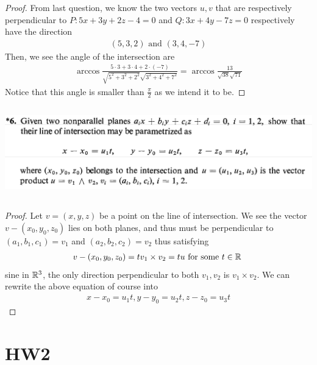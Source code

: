\documentclass{report}
\begin{document}
\begin{proof}
From last question, we know the two vectors $u,v$ that are respectively perpendicular to  $P:5x+3y+2z-4=0$ and  $Q:3x+4y-7z=0$ respectively have the direction 
 \begin{align*}
   (5,3,2)\text{ and }(3,4,-7)
\end{align*}
Then, we see the angle of the intersection are 
\begin{align*}
\arccos \frac{5\cdot 3+3\cdot 4 +2 \cdot (-7)}{\sqrt{5^2+3^2+2^2} \sqrt{3^2+4^2+7^2} }=\arccos \frac{13}{\sqrt{38}\sqrt{71}  }
\end{align*}
Notice that this angle is smaller than $\frac{\pi}{2}$ as we intend it to be. 
\end{proof}
\begin{question}{}{}
\includegraphics[height=4cm,width=18cm]{qu12}
\end{question}
\begin{proof}
Let $v=(x,y,z)$ be a point on the line of intersection.  We see the vector  $v-(x_0,y_0,z_0)$ lies on both planes, and thus must be perpendicular to $(a_1,b_1,c_1)=v_1$ and $(a_2,b_2,c_2)=v_2$ thus satisfying 
\begin{align*}
v-(x_0,y_0,z_0)=tv_1\times v_2=tu\text{ for some $t\in\mathbb{R}$ }
\end{align*}
sine in $\mathbb{R}^3$, the only direction perpendicular to both  $v_1,v_2$ is  $v_1\times v_2$. We can rewrite the above equation of course into 
\begin{align*}
x-x_0=u_1t,y-y_0=u_2t,z-z_0=u_3t
\end{align*}
\end{proof}
\section{HW2}
\end{document}
